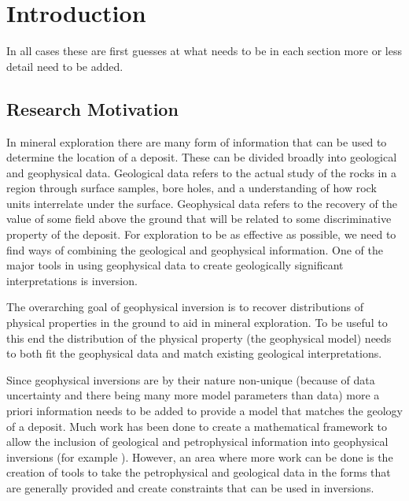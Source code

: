 
\chapter{Introduction}
\label{ch:Introduction}

\begin{epigraph}
\end{epigraph}

In all cases these are first guesses at what needs to be in each section more or less detail need to be added.

\section{Research Motivation}
\label{sec:Research Motivation}

In mineral exploration there are many form of information that can be used to determine the location of a deposit. These can be divided broadly into geological and geophysical data. Geological data refers to the actual study of the rocks in a region through surface samples, bore holes, and a understanding of how rock units interrelate under the surface. Geophysical data refers to the recovery of the value of some field above the ground that will be related to some discriminative property of the deposit. For exploration to be as effective as possible, we need to find ways of combining the geological and geophysical information. One of the major tools in using geophysical data to create geologically significant interpretations is inversion.

The overarching goal of geophysical inversion is to recover distributions of physical properties in the ground to aid in mineral exploration. To be useful to this end the distribution of the physical property (the geophysical model) needs to both fit the geophysical data and match existing geological interpretations. 

Since geophysical inversions are by their nature non-unique (because of data uncertainty and there being many more model parameters than data) more a priori information needs to be added to provide a model that matches the geology of a deposit. Much work has been done to create a mathematical framework to allow the inclusion of geological and petrophysical information into geophysical inversions (for example \citep{li19963}). However, an area where more work can be done is the creation of tools to take the petrophysical and geological data in the forms that are generally provided and create constraints that can be used in inversions.

